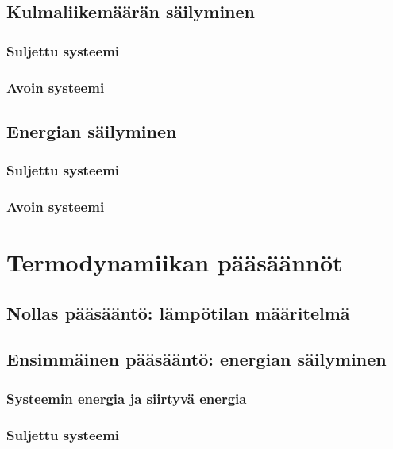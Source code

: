 \documentclass[12pt,a4paper,finnish]{book}
\begin{document}
\section{Kulmaliikemäärän säilyminen}

\subsection{Suljettu systeemi}

\subsection{Avoin systeemi}

\section{Energian säilyminen}

\subsection{Suljettu systeemi}

\subsection{Avoin systeemi}

\chapter{Termodynamiikan pääsäännöt} %

\section{Nollas pääsääntö: lämpötilan määritelmä}

\section{Ensimmäinen pääsääntö: energian säilyminen}

\subsection{Systeemin energia ja siirtyvä energia}

\subsection{Suljettu systeemi}
\end{document}

